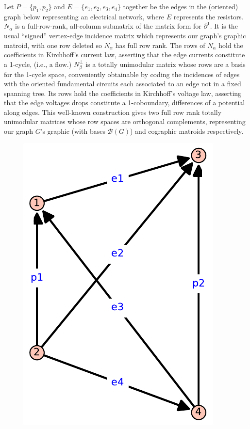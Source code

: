 Let $P=\{p_1, p_2\}$ and $E=\{e_1, e_2, e_3, e_4\}$ together be the edges in the (oriented) graph
below representing an electrical network, where $E$ represents the resistors.   $N_\alpha$ is
a full-row-rank, all-column submatrix of the matrix form for $\partial^1$.  It is the
usual ``signed'' vertex-edge incidence matrix which represents our graph's graphic matroid, with one
row deleted so $N_\alpha$ has full row rank.  The rows of $N_\alpha$ hold the coefficients in
Kirchhoff's current law, asserting that the edge currents constitute a 1-cycle, (i.e., a flow.)
$N_\beta^\perp$ is a totally unimodular matrix whose
rows are a basis for the 1-cycle space, conveniently
obtainable by coding the incidences of edges with the oriented fundamental
circuits each associated to an edge not in a fixed spanning tree.
Its rows hold the coefficients in
Kirchhoff's voltage law, asserting that the edge
voltages drops constitute a 1-coboundary, differences
of a potential along edges.
This well-known construction gives
two full row rank totally unimodular matrices whose row spaces are orthogonal complements,
representing our graph $G$'s
graphic (with bases $\mathcal{B}(G)$) and cographic matroids respectively.

\begin{figure}
  \includegraphics[scale=0.5]{K4.pdf}
\end{figure}


